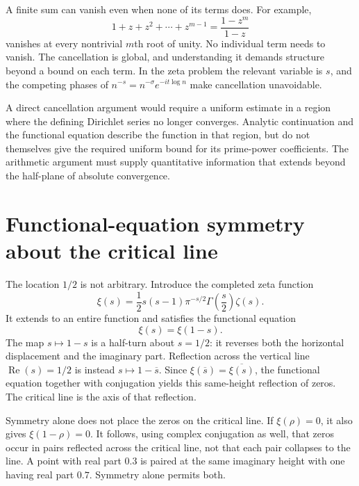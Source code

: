 \documentclass[11pt,openany,oneside]{scrbook}
\theoremstyle{definition}
\theoremstyle{remark}
\newcommand{\Rea}{\operatorname{Re}}
\newcommand{\sig}{\sigma}
\begin{document}
A finite sum can vanish even when none of its terms does. For example,
\[
1+z+z^2+\cdots+z^{m-1}=\frac{1-z^m}{1-z}
\]
vanishes at every nontrivial $m$th root of unity. No individual term needs to vanish. The cancellation is global, and understanding it demands structure beyond a bound on each term. In the zeta problem the relevant variable is $s$, and the competing phases of $n^{-s}=n^{-\sig}e^{-it\log n}$ make cancellation unavoidable.

A direct cancellation argument would require a uniform estimate in a region where the defining Dirichlet series no longer converges. Analytic continuation and the functional equation describe the function in that region, but do not themselves give the required uniform bound for its prime-power coefficients. The arithmetic argument must supply quantitative information that extends beyond the half-plane of absolute convergence.

\section{Functional-equation symmetry about the critical line}
The location $1/2$ is not arbitrary. Introduce the completed zeta function
\begin{equation}\label{eq:xi}
\xi(s)=\frac12s(s-1)\pi^{-s/2}\Gamma\!\left(\frac{s}{2}\right)\zeta(s).
\end{equation}
It extends to an entire function and satisfies the functional equation
\begin{equation}\label{eq:fe}
\xi(s)=\xi(1-s).
\end{equation}
The map $s\mapsto1-s$ is a half-turn about $s=1/2$: it reverses both the horizontal displacement and the imaginary part. Reflection across the vertical line $\Rea(s)=1/2$ is instead $s\mapsto1-\overline{s}$. Since $\xi(\overline{s})=\overline{\xi(s)}$, the functional equation together with conjugation yields this same-height reflection of zeros. The critical line is the axis of that reflection.

Symmetry alone does not place the zeros on the critical line. If $\xi(\rho)=0$, it also gives $\xi(1-\rho)=0$. It follows, using complex conjugation as well, that zeros occur in pairs reflected across the critical line, not that each pair collapses to the line. A point with real part $0.3$ is paired at the same imaginary height with one having real part $0.7$. Symmetry alone permits both.
\end{document}
